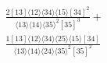 \documentclass[varwidth, border=5pt]{standalone}
\begin{document}
\begin{my}
$\begin{gathered}
\scriptscriptstyle\frac{2[13]⟨12⟩⟨34⟩⟨15⟩[34]^2}{⟨13⟩⟨14⟩⟨35⟩^2[35]^3}+\\
\scriptscriptstyle\frac{1[13]⟨12⟩⟨34⟩⟨25⟩⟨15⟩[34]}{⟨13⟩⟨14⟩⟨24⟩⟨35⟩^2[35]^2}\phantom{+}
\end{gathered}$
\end{my}
\end{document}
